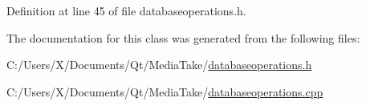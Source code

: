 Definition at line 45 of file databaseoperations.\-h.



The documentation for this class was generated from the following files\-:\begin{DoxyCompactItemize}
\item 
C\-:/\-Users/\-X/\-Documents/\-Qt/\-Media\-Take/\hyperlink{databaseoperations_8h}{databaseoperations.\-h}\item 
C\-:/\-Users/\-X/\-Documents/\-Qt/\-Media\-Take/\hyperlink{databaseoperations_8cpp}{databaseoperations.\-cpp}\end{DoxyCompactItemize}
